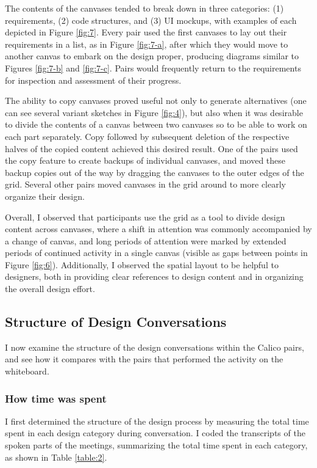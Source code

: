 \documentclass[12pt,fleqn]{ucithesis}
\begin{document}
The contents of the canvases tended to break down in three categories: (1) requirements, (2) code structures, and (3) UI mockups, with examples of each depicted in Figure \ref{fig:7}. Every pair used the first canvases to lay out their requirements in a list, as in Figure \ref{fig:7-a}, after which they would move to another canvas to embark on the design proper, producing diagrams similar to Figures \ref{fig:7-b} and \ref{fig:7-c}. Pairs would frequently return to the requirements for inspection and assessment of their progress.

The ability to copy canvases proved useful not only to generate alternatives (one can see several variant sketches in Figure \ref{fig:4}), but also when it was desirable to divide the contents of a canvas between two canvases so to be able to work on each part separately. Copy followed by subsequent deletion of the respective halves of the copied content achieved this desired result. One of the pairs used the copy feature to create backups of individual canvases, and moved these backup copies out of the way by dragging the canvases to the outer edges of the grid. Several other pairs moved canvases in the grid around to more clearly organize their design.

Overall, I observed that participants use the grid as a tool to divide design content across canvases, where a shift in attention was commonly accompanied by a change of canvas, and long periods of attention were marked by extended periods of continued activity in a single canvas (visible as gaps between points in Figure \ref{fig:6}). Additionally, I observed the spatial layout to be helpful to designers, both in providing clear references to design content and in organizing the overall design effort.


\subsection {Structure of Design Conversations}
\label{results:3}

I now examine the structure of the design conversations within the Calico pairs, and see how it compares with the pairs that performed the activity on the whiteboard. 

\subsubsection {How time was spent}
\label{results:31}

I first determined the structure of the design process by measuring the total time spent in each design category during conversation. I coded the transcripts of the spoken parts of the meetings, summarizing the total time spent in each category, as shown in Table \ref{table:2}. 
\end{document}
